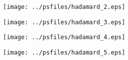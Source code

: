 \documentclass[a4paper,11pt]{article}
\begin{document}
\begin{center}
\texttt{[image: ../psfiles/hadamard\_2.eps]}
\end{center}
\newpage
\begin{center}
\texttt{[image: ../psfiles/hadamard\_3.eps]}
\end{center}
\newpage
\begin{center}
\texttt{[image: ../psfiles/hadamard\_4.eps]}
\end{center}
\newpage
\begin{center}
\texttt{[image: ../psfiles/hadamard\_5.eps]}
\end{center}
\end{document}
